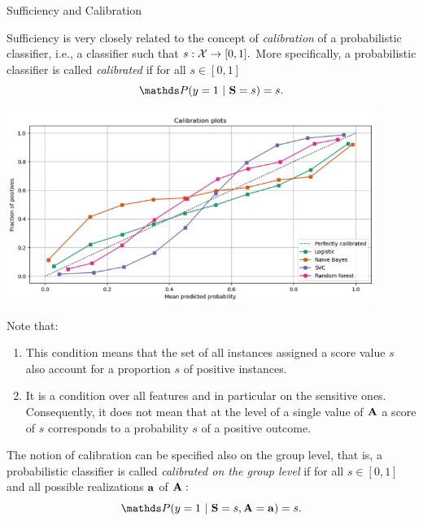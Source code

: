 \begin{vbframe}{Sufficiency and Calibration}
	\footnotesize{
		\begin{itemize}
			\begin{minipage}{0.45\textwidth}
				\item Sufficiency is very closely related to the concept of \emph{calibration} of a probabilistic classifier, i.e., a classifier such that $s:\mathcal{X} \to [0,1].$ More specifically, a probabilistic classifier is called \emph{calibrated} if for all $s\in[0,1]$
				$$  \P(  y = 1 ~|~ \mathbf{S} = s  ) = s. $$
			\end{minipage}
		\begin{minipage}{0.45\textwidth}
			\centering
			\includegraphics[width=0.9\textwidth]{figure/calibration.png}
		\end{minipage}
%			
			\item Note that: 
%			
			\begin{enumerate}
%				
			\footnotesize
%			
				\item This condition means that the set of all instances assigned a score value $s$ also account for a proportion $s$ of positive instances.
%				
				\item It is a condition over all features and in particular on the sensitive ones. Consequently, it does not mean that at the level of a single value of $\mathbf{A}$ a score of $s$ corresponds to a probability $s$ of a positive outcome. 
%			
			\end{enumerate}
%
			\item The notion of calibration can be specified also on the group level, that is,  a probabilistic classifier is called \emph{calibrated on the group level} if for all $s\in[0,1]$ and all possible realizations $\mathbf{a}$ of $\mathbf{A}:$
%			
			$$  \P(  y = 1 ~|~ \mathbf{S} = s, \sens = \ba  ) = s. $$
%			 
%
			\framebreak
%			
			\begin{align*}

\end{align*}
\end{itemize}}
\end{vbframe}
